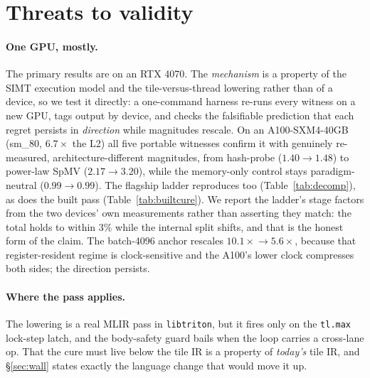 \documentclass[sigplan,anonymous,review,nonacm,10pt]{acmart}
\begin{document}
\section{Threats to validity}\label{sec:threats}

\paragraph{One GPU, mostly.} The primary results are on an RTX 4070. The \emph{mechanism}
is a property of the SIMT execution model and the tile-versus-thread lowering rather than
of a device, so we test it directly: a one-command harness re-runs every witness on a new
GPU, tags output by device, and checks the falsifiable prediction that each regret persists
in \emph{direction} while magnitudes rescale. On an A100-SXM4-40GB (sm\_80, $6.7\times$ the
L2) all five portable witnesses confirm it with genuinely re-measured, architecture-different
magnitudes, from hash-probe ($1.40\!\to\!1.48$) to power-law SpMV
($2.17\!\to\!3.20$), while the memory-only control stays paradigm-neutral
($0.99\!\to\!0.99$). The flagship ladder reproduces too
(Table~\ref{tab:decomp}), as does the built pass (Table~\ref{tab:builtcure}). We report
the ladder's stage factors from the two devices' own measurements rather than asserting
they match: the total holds to within $3\%$ while the internal split shifts, and that is
the honest form of the claim. The
batch-4096 anchor rescales $10.1\times\!\to\!5.6\times$, because that register-resident
regime is clock-sensitive and the A100's lower clock compresses both sides; the direction
persists.

\paragraph{Where the pass applies.} The lowering is a real MLIR pass in \texttt{libtriton},
but it fires only on the \texttt{tl.max} lock-step latch, and the body-safety guard bails
when the loop carries a cross-lane op. That the cure must live below the tile IR is a
property of \emph{today's} tile IR, and \S\ref{sec:wall} states exactly the language change
that would move it up.
\end{document}
